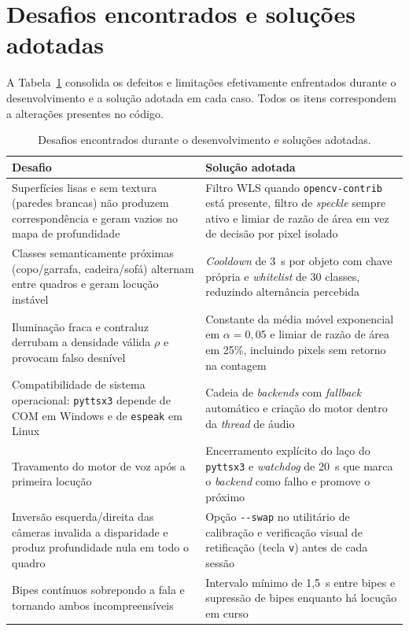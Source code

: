 \documentclass[12pt]{article}
\begin{document}
\section{Desafios encontrados e soluções adotadas}

A Tabela~\ref{quadro2} consolida os defeitos e limitações efetivamente enfrentados durante
o desenvolvimento e a solução adotada em cada caso. Todos os itens
correspondem a alterações presentes no código.

\begin{table}[ht]
\centering
\caption{Desafios encontrados durante o desenvolvimento e soluções adotadas.}
\label{quadro2}
\footnotesize
\begin{tabular}{p{5.8cm}p{6.7cm}}
\toprule
\textbf{Desafio} & \textbf{Solução adotada} \\
\midrule
Superfícies lisas e sem textura (paredes brancas) não produzem correspondência
e geram vazios no mapa de profundidade &
Filtro WLS quando \texttt{opencv-contrib} está presente, filtro de
\textit{speckle} sempre ativo e limiar de razão de área em vez de decisão por
pixel isolado \\
\addlinespace
Classes semanticamente próximas (copo/garrafa, cadeira/sofá) alternam entre
quadros e geram locução instável &
\textit{Cooldown} de 3~s por objeto com chave própria e
\textit{whitelist} de 30 classes, reduzindo alternância percebida \\
\addlinespace
Iluminação fraca e contraluz derrubam a densidade válida $\rho$ e provocam
falso desnível &
Constante da média móvel exponencial em $\alpha = 0{,}05$ e limiar de razão
de área em 25\%, incluindo pixels sem retorno na contagem \\
\addlinespace
Compatibilidade de sistema operacional: \texttt{pyttsx3} depende de COM em
Windows e de \texttt{espeak} em Linux &
Cadeia de \textit{backends} com \textit{fallback} automático e criação do
motor dentro da \textit{thread} de áudio \\
\addlinespace
Travamento do motor de voz após a primeira locução &
Encerramento explícito do laço do \texttt{pyttsx3} e \textit{watchdog} de 20~s
que marca o \textit{backend} como falho e promove o próximo \\
\addlinespace
Inversão esquerda/direita das câmeras invalida a disparidade e produz
profundidade nula em todo o quadro &
Opção \texttt{-{}-swap} no utilitário de calibração e verificação visual de
retificação (tecla \texttt{v}) antes de cada sessão \\
\addlinespace
Bipes contínuos sobrepondo a fala e tornando ambos incompreensíveis &
Intervalo mínimo de 1,5~s entre bipes e supressão de bipes enquanto há
locução em curso \\
\bottomrule
\end{tabular}
\end{table}
\end{document}
